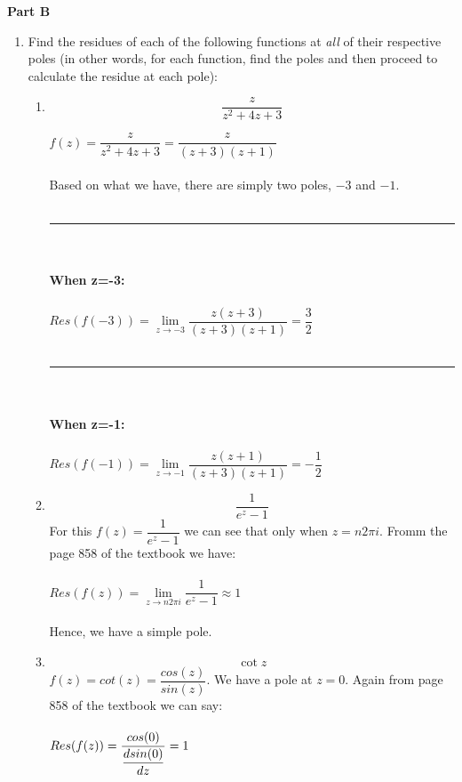 \documentclass[fleqn]{article}
\begin{document}
  \textbf{Part B}
  \begin{enumerate}

    \item Find the residues of each of the following functions at \emph{all} of their respective poles (in other words, for each function, find the poles and then proceed to calculate the residue at each pole):
    \begin{enumerate}
      \item $$\frac{z}{z^2 + 4z + 3}$$
        \textcolor{hwColor}{
          $
            f(z)=\dfrac{z}{z^2+4z+3}=\dfrac{z}{(z+3)(z+1)}
          $
          \\
          \\
          Based on what we have, there are simply two poles, $-3$ and $-1$.
          \\
          \\
          \rule{15cm}{1pt}
          \\
          \\
          \textbf{When z=-3:}
          \\
          \\
          $
            Res(f(-3))=\lim\limits_{z \to -3} \dfrac{z(z+3)}{(z+3)(z+1)}=\dfrac{3}{2}
          $
          \\
          \\
          \rule{15cm}{1pt}
          \\
          \\
          \textbf{When z=-1:}
          \\
          \\
          $
            Res(f(-1))=\lim\limits_{z \to -1} \dfrac{z(z+1)}{(z+3)(z+1)}=-\dfrac{1}{2}
          $
        }
      
      \item $$\frac{1}{e^z - 1}$$
        \textcolor{hwColor}{
          For this $f(z)=\dfrac{1}{e^z-1}$ we can see that only when $z=n2\pi i$. Fromm the page 858 of the textbook we have:
          \\
          \\
          $
            Res(f(z))=\lim\limits_{z \to n2\pi i} \dfrac{1}{e^z-1} \approx 1
          $
          \\
          \\
          Hence, we have a simple pole.
        }
      
      \item $$\cot z$$
        \textcolor{hwColor}{
          $f(z)=cot(z)=\dfrac{cos(z)}{sin(z)}$. We have a pole at $z=0$. Again from page 858 of the textbook we can say: 
          \\
          \\
          $
            Res(f(z))=\dfrac{cos(0)}{\dfrac{d sin(0)}{dz}}=1
            \\
            \\
          $
        }
    \end{enumerate} 
    

\end{enumerate}
\end{document}
